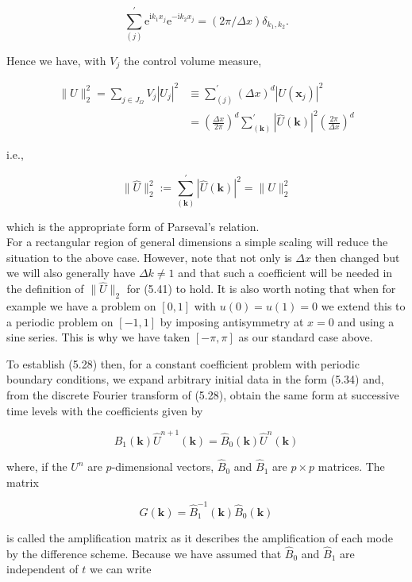 \documentclass[10pt]{article}
\begin{document}
\[
\sum_{(j)}^{\prime} \mathrm{e}^{\mathrm{i} k_{1} x_{j}} \mathrm{e}^{-\mathrm{i} k_{2} x_{j}}=(2 \pi / \Delta x) \delta_{k_{1}, k_{2}} .
\]

Hence we have, with \(V_{j}\) the control volume measure,

\[
\begin{aligned}
\|U\|_{2}^{2}=\sum_{j \in J_{\Omega}} V_{j}\left|U_{j}\right|^{2} & \equiv \sum_{(j)}^{\prime}(\Delta x)^{d}\left|U\left(\mathbf{x}_{j}\right)\right|^{2} \\
& =\left(\frac{\Delta x}{2 \pi}\right)^{d} \sum_{(\mathbf{k})}^{\prime}|\widehat{U}(\mathbf{k})|^{2}\left(\frac{2 \pi}{\Delta x}\right)^{d}
\end{aligned}
\]

i.e.,

\[
\|\widehat{U}\|_{2}^{2}:=\sum_{(\mathbf{k})}^{\prime}|\widehat{U}(\mathbf{k})|^{2}=\|U\|_{2}^{2}
\]

which is the appropriate form of Parseval's relation.\\
For a rectangular region of general dimensions a simple scaling will reduce the situation to the above case. However, note that not only is \(\Delta x\) then changed but we will also generally have \(\Delta k \neq 1\) and that such a coefficient will be needed in the definition of \(\|\widehat{U}\|_{2}\) for (5.41) to hold. It is also worth noting that when for example we have a problem on \([0,1]\) with \(u(0)=u(1)=0\) we extend this to a periodic problem on \([-1,1]\) by imposing antisymmetry at \(x=0\) and using a sine series. This is why we have taken \([-\pi, \pi]\) as our standard case above.

To establish (5.28) then, for a constant coefficient problem with periodic boundary conditions, we expand arbitrary initial data in the form (5.34) and, from the discrete Fourier transform of (5.28), obtain the same form at successive time levels with the coefficients given by

\[
\widehat{B}_{1}(\mathbf{k}) \widehat{U}^{n+1}(\mathbf{k})=\widehat{B}_{0}(\mathbf{k}) \widehat{U}^{n}(\mathbf{k})
\]

where, if the \(U^{n}\) are \(p\)-dimensional vectors, \(\widehat{B}_{0}\) and \(\widehat{B}_{1}\) are \(p \times p\) matrices. The matrix

\[
G(\mathbf{k})=\widehat{B}_{1}^{-1}(\mathbf{k}) \widehat{B}_{0}(\mathbf{k})
\]

is called the amplification matrix as it describes the amplification of each mode by the difference scheme. Because we have assumed that \(\widehat{B}_{0}\) and \(\widehat{B}_{1}\) are independent of \(t\) we can write
\end{document}
